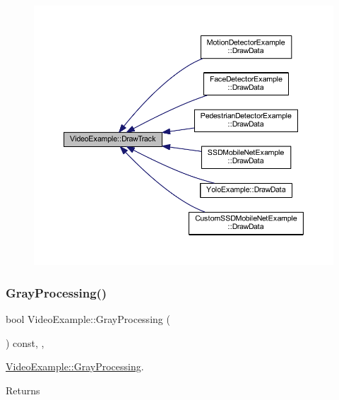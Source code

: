 \begin{figure}[H]
\begin{center}
\leavevmode
\includegraphics[width=350pt]{class_video_example_a84a040bc87b915c5ee18c5d11235f40c_icgraph}
\end{center}
\end{figure}
\mbox{\label{class_video_example_af8ea44f17711129d2b954d1f01fee1f0}} 
\subsubsection{\texorpdfstring{Gray\+Processing()}{GrayProcessing()}}
{\footnotesize\ttfamily bool Video\+Example\+::\+Gray\+Processing (\begin{DoxyParamCaption}{ }\end{DoxyParamCaption}) const\hspace{0.3cm}{\ttfamily [protected]}, {\ttfamily [virtual]}, {\ttfamily [inherited]}}



\mbox{\hyperlink{class_video_example_af8ea44f17711129d2b954d1f01fee1f0}{Video\+Example\+::\+Gray\+Processing}}. 

\begin{DoxyReturn}{Returns}

\end{DoxyReturn}


